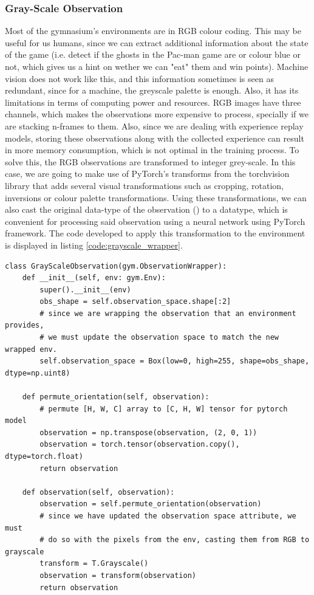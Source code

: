 \subsubsection{Gray-Scale Observation}
Most of the gymnasium's environments are in RGB colour coding. This may be useful for us humans, since we can extract additional information about the state of the game (i.e. detect if the ghosts in the Pac-man game are or colour blue or not, which gives us a hint on wether we can "eat" them and win points). Machine vision does not work like this, and this information sometimes is seen as redundant, since for a machine, the greyscale palette is enough. Also, it has its limitations in terms of computing power and resources. RGB images have three channels, which makes the observations more expensive to process, specially if we are stacking n-frames to them. Also, since we are dealing with experience replay models, storing these observations along with the collected experience can result in more memory consumption, which is not optimal in the training process. To solve this, the RGB observations are transformed to integer grey-scale. In this case, we are going to make use of PyTorch's transforms from the torchvision library that adds several visual transformations such as cropping, rotation, inversions or colour palette transformations. Using these transformations, we can also cast the original data-type of the observation () to a  datatype, which is convenient for processing said observation using a neural network using PyTorch framework. The code developed to apply this transformation to the environment is displayed in listing \ref{code:grayscale_wrapper}.

\begin{lstlisting}[caption={Grayscale frame wrapper}, label={code:grayscale_wrapper}]
class GrayScaleObservation(gym.ObservationWrapper):
	def __init__(self, env: gym.Env):
		super().__init__(env)
		obs_shape = self.observation_space.shape[:2]
		# since we are wrapping the observation that an environment provides,
		# we must update the observation space to match the new wrapped env.
		self.observation_space = Box(low=0, high=255, shape=obs_shape, dtype=np.uint8)
	
	def permute_orientation(self, observation):
		# permute [H, W, C] array to [C, H, W] tensor for pytorch model
		observation = np.transpose(observation, (2, 0, 1))
		observation = torch.tensor(observation.copy(), dtype=torch.float)
		return observation
	
	def observation(self, observation):
		observation = self.permute_orientation(observation)
		# since we have updated the observation space attribute, we must 
		# do so with the pixels from the env, casting them from RGB to grayscale
		transform = T.Grayscale()
		observation = transform(observation)
		return observation
	
\end{lstlisting}

